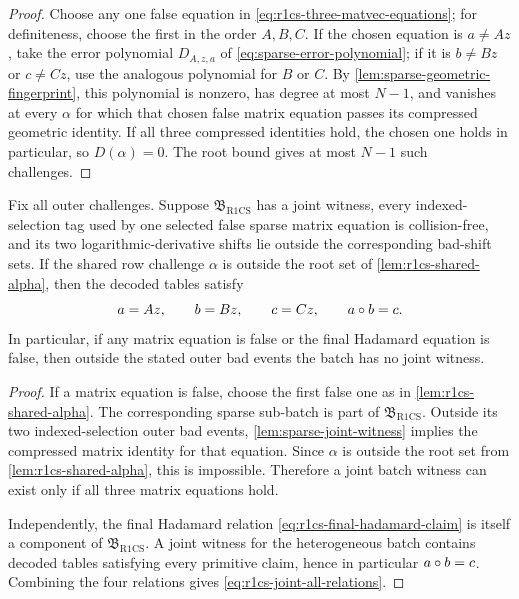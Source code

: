 \begin{proof}
Choose any one false equation in \eqref{eq:r1cs-three-matvec-equations}; for definiteness, choose the first in the order $A,B,C$.  If the chosen equation is $a\ne Az$, take the error polynomial $D_{A,z,a}$ of \eqref{eq:sparse-error-polynomial}; if it is $b\ne Bz$ or $c\ne Cz$, use the analogous polynomial for $B$ or $C$.  By \cref{lem:sparse-geometric-fingerprint}, this polynomial is nonzero, has degree at most $N-1$, and vanishes at every $\alpha$ for which that chosen false matrix equation passes its compressed geometric identity.  If all three compressed identities hold, the chosen one holds in particular, so $D(\alpha)=0$.  The root bound gives at most $N-1$ such challenges.
\end{proof}

\begin{lemma}
\label{lem:r1cs-joint-witness}
Fix all outer challenges.  Suppose $\mathfrak B_{\mathrm{R1CS}}$ has a joint witness, every indexed-selection tag used by one selected false sparse matrix equation is collision-free, and its two logarithmic-derivative shifts lie outside the corresponding bad-shift sets.  If the shared row challenge $\alpha$ is outside the root set of \cref{lem:r1cs-shared-alpha}, then the decoded tables satisfy
\begin{equation}
  a=Az,
  \qquad b=Bz,
  \qquad c=Cz,
  \qquad a\circ b=c.
  \label{eq:r1cs-joint-all-relations}
\end{equation}
In particular, if any matrix equation is false or the final Hadamard equation is false, then outside the stated outer bad events the batch has no joint witness.
\end{lemma}

\begin{proof}
If a matrix equation is false, choose the first false one as in \cref{lem:r1cs-shared-alpha}.  The corresponding sparse sub-batch is part of $\mathfrak B_{\mathrm{R1CS}}$.  Outside its two indexed-selection outer bad events, \cref{lem:sparse-joint-witness} implies the compressed matrix identity for that equation.  Since $\alpha$ is outside the root set from \cref{lem:r1cs-shared-alpha}, this is impossible.  Therefore a joint batch witness can exist only if all three matrix equations hold.

Independently, the final Hadamard relation \eqref{eq:r1cs-final-hadamard-claim} is itself a component of $\mathfrak B_{\mathrm{R1CS}}$.  A joint witness for the heterogeneous batch contains decoded tables satisfying every primitive claim, hence in particular $a\circ b=c$.  Combining the four relations gives \eqref{eq:r1cs-joint-all-relations}.
\end{proof}

